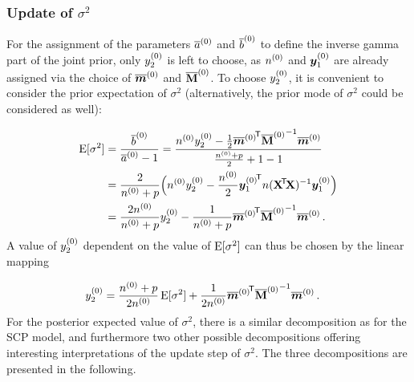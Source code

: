 \subsubsection{Update of \texorpdfstring{$\sigma^2$}{sigma2}}
\label{sec:cccp-update2}

For the assignment of the parameters $\overline{a}^{(0)}$ and $\overline{b}^{(0)}$ to define the inverse gamma part
of the joint prior, only $y^{(0)}_2$ is left to choose,
as $n^{(0)}$ and ${\bm y}^{(0)}_1$ are already assigned via the choice of $\overline{{\bm m}}^{(0)}$ and $\overline{\mathbf{M}}^{(0)}$.
To choose $y^{(0)}_2$, it is convenient to consider the prior expectation of $\sigma^2$
(alternatively, the prior mode of $\sigma^2$ could be considered as well):

\begin{align*}
\operatorname{E}[\sigma^2] &= \frac{\overline{b}^{(0)}}{\overline{a}^{(0)} - 1}
              = \frac{n^{(0)} y^{(0)}_2 -\frac{1}{2} {\overline{{\bm m}}^{(0)}}^{{\mbox{\!\scriptsize\textsf{T}}}} {\overline{\mathbf{M}}^{(0)}}^{-1}\overline{{\bm m}}^{(0)}}{\frac{n^{(0)} + p}{2}+1-1} \\
             &= \frac{2}{n^{(0)} + p}\Big(n^{(0)} y^{(0)}_2 -\frac{n^{(0)}}{2} {{\bm y}^{(0)}_1}^{{\mbox{\!\scriptsize\textsf{T}}}} n(\mathbf{X}^{{\mbox{\!\scriptsize\textsf{T}}}} \! \mathbf{X})^{-1} {\bm y}^{(0)}_1\Big) \\
             &= \frac{2 n^{(0)}}{n^{(0)} + p} y^{(0)}_2 - \frac{1}{n^{(0)} + p} {\overline{{\bm m}}^{(0)}}^{{\mbox{\!\scriptsize\textsf{T}}}} {\overline{\mathbf{M}}^{(0)}}^{-1}\overline{{\bm m}}^{(0)}\,.
\end{align*}
A value of $y^{(0)}_2$ dependent on the value of $\operatorname{E}[\sigma^2]$ can thus be chosen by the linear mapping

\begin{align*}
y^{(0)}_2 &= \frac{n^{(0)} + p}{2 n^{(0)}} \operatorname{E}[\sigma^2] + \frac{1}{2n^{(0)}} {\overline{{\bm m}}^{(0)}}^{{\mbox{\!\scriptsize\textsf{T}}}} {\overline{\mathbf{M}}^{(0)}}^{-1}\overline{{\bm m}}^{(0)}\,.
\end{align*}
%
%
For the posterior expected value of $\sigma^2$, there is a similar decomposition
as for the SCP model, and furthermore two other possible decompositions offering
interesting interpretations of the update step of $\sigma^2$.
The three decompositions are presented in the following.


